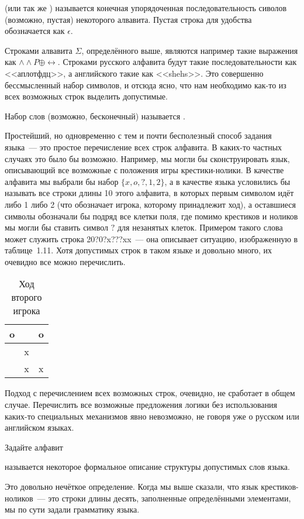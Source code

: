 \begin{definition}
 (или так же ) называется конечная упорядоченная последовательность сиволов (возможно, пустая) некоторого алвавита. Пустая строка для удобства обозначается как $\epsilon$.
\end{definition}

Строками алвавита $\Sigma$, определённого выше, являются например такие выражения как $\land\land P\oplus\leftrightarrow$. Строками русского алфавита будут такие последовательности как <<аплотфдц>>, а английского такие как <<shehs>>. Это совершенно бессмысленный набор символов, и отсюда ясно, что нам необходимо как-то из всех возможных строк выделить допустимые.

\begin{definition}
Набор слов (возможно, бесконечный) называется .
\end{definition}

Простейший, но одновременно с тем и почти бесполезный способ задания языка~--- это простое перечисление всех строк алфавита. В каких-то частных случаях это было бы возможно. Например, мы могли бы сконструировать язык, описывающий все возможные с положения игры крестики-нолики. В качестве алфавита мы выбрали бы набор $\{x, o, ?,1, 2\}$, а в качестве языка условились бы называть все строки длины 10 этого алфавита, в которых первым символом идёт либо 1 либо 2 (что обозначает игрока, которому принадлежит ход), а оставшиеся символы обозначали бы подряд все клетки поля, где помимо крестиков и ноликов мы могли бы ставить символ $?$ для незанятых клеток. Примером такого слова может служить строка 20?0?x???xx~--- она описывает ситуацию, изображенную в таблице~1.11. Хотя допустимых строк в таком языке и довольно много, их очевидно все можно перечислить.

\begin{table}[h]
\centering
\begin{tabular}{c | c | c}
o & & o\\
\hline
  & x & \\
\hline
 & x & x
\end{tabular}
\caption{Ход второго игрока}
\end{table}

Подход с перечислением всех возможных строк, очевидно, не сработает в общем случае. Перечислить все возможные предложения логики без использования каких-то специальных механизмов явно невозможно, не говоря уже о русском или английском языках.

\begin{exercise}
Задайте алфавит
\end{exercise}

\begin{exercise}
 называется некоторое формальное описание структуры допустимых слов языка.
\end{exercise}

Это довольно нечёткое определение. Когда мы выше сказали, что язык крестиков-ноликов~--- это строки длины десять, заполненные определёнными элементами, мы по сути задали грамматику языка.
